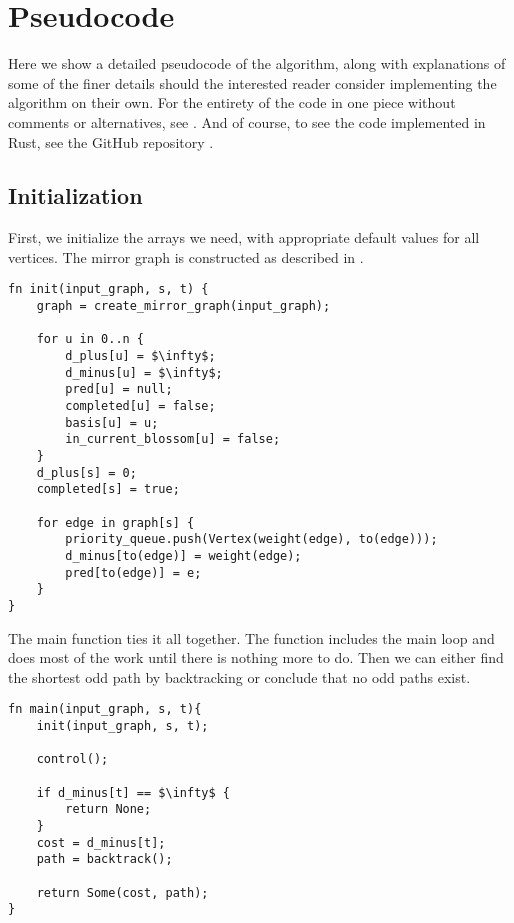 \section{Pseudocode}
\label{section:odd-path-pseudocode}
Here we show a detailed pseudocode of the algorithm, along with explanations of some of the finer details should the interested reader consider implementing the algorithm on their own. For the entirety of the code in one piece without comments or alternatives, see . And of course, to see the code implemented in Rust, see the GitHub repository \cite{source:codebase}.

\subsection{Initialization}
First, we initialize the arrays we need, with appropriate default values for all vertices. The mirror graph is constructed as described in .
\begin{lstlisting}[caption={Initialization},label=Listing,mathescape=true]
fn init(input_graph, s, t) {
    graph = create_mirror_graph(input_graph);

    for u in 0..n {
        d_plus[u] = $\infty$;
        d_minus[u] = $\infty$;
        pred[u] = null;
        completed[u] = false;
        basis[u] = u;
        in_current_blossom[u] = false;
    }
    d_plus[s] = 0;
    completed[s] = true;

    for edge in graph[s] {
        priority_queue.push(Vertex(weight(edge), to(edge)));
        d_minus[to(edge)] = weight(edge);
        pred[to(edge)] = e;
    }
}
\end{lstlisting}

The main function ties it all together. The  function includes the main loop and does most of the work until there is nothing more to do. Then we can either find the shortest odd path by backtracking or conclude that no odd paths exist.
\begin{lstlisting}[caption={Main},label=Listing,mathescape=true]
fn main(input_graph, s, t){
    init(input_graph, s, t);

    control();

    if d_minus[t] == $\infty$ {
        return None;
    }
    cost = d_minus[t];
    path = backtrack();
    
    return Some(cost, path);
}
\end{lstlisting}

